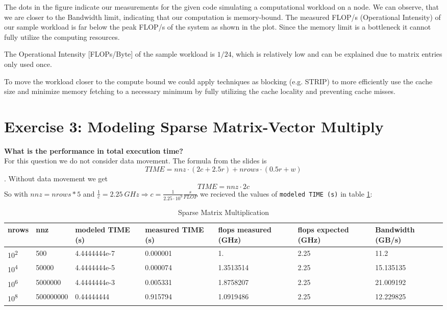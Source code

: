 \documentclass[a4paper,10pt]{article}
\begin{document}
The dots in the figure indicate our measurements for the given code simulating a computational workload
on a node. We can observe, that we are closer to the Bandwidth limit, indicating that our computation is 
memory-bound. 
The measured FLOP/s (Operational Intensity) of our sample workload is far below the peak FLOP/s of the system as shown in the plot. Since the memory limit is a bottleneck it cannot
fully utilize the computing resources.

The Operational Intensity [FLOPs/Byte] of the sample workload is $1/24$, which is relatively low and can be explained due to matrix entries only used once.

To move the workload closer to the compute bound we could apply techniques as blocking (e.g. STRIP) to more efficiently use
the cache size and minimize memory fetching to a necessary minimum by fully utilizing the cache locality and preventing cache misses.

\section{Exercise 3: Modeling Sparse Matrix-Vector Multiply}
\textbf{What is the performance in total execution time?}\\
For this question we do not consider data movement.
The formula from the slides is 
$$TIME = nnz \cdot (2c + 2.5r) + nrows \cdot (0.5r + w)$$.
Without data movement we get
$$TIME = nnz \cdot 2c$$
So with \(nnz = nrows * 5\) and
$\frac{1}{c} = 2.25\ GHz \Rightarrow c = \frac{1}{2.25 \cdot 10^9}\frac{s}{FLOP}$
we recieved the values of \verb|modeled TIME (s)| in table \ref{tab:spmm}:

\renewcommand{\arraystretch}{1.2}

\begin{table}[H]
\centering
\begin{tabular}{|p{1cm}|p{1.4cm}|p{2cm}|p{1.4cm}|p{2cm}|p{1.4cm}|p{1.6cm}|}
\hline
nrows & nnz & modeled TIME (s) & measured TIME (s) & flops measured (GHz) & flops expected (GHz) & Bandwidth (GB/s)\\
\hline
10\textsuperscript{2} & 500 & 4.4444444e-7 & 0.000001 & 1. & 2.25 & 11.2\\
10\textsuperscript{4} & 50000 & 4.4444444e-5 & 0.000074 & 1.3513514 & 2.25 & 15.135135\\
10\textsuperscript{6} & 5000000 & 4.4444444e-3 & 0.005331 & 1.8758207 & 2.25 & 21.009192\\
10\textsuperscript{8} & 500000000 & 0.44444444 & 0.915794 & 1.0919486 & 2.25 & 12.229825\\
\hline
\end{tabular}
\caption{Sparse Matrix Multiplication}
\label{tab:spmm}
\end{table}
\end{document}
